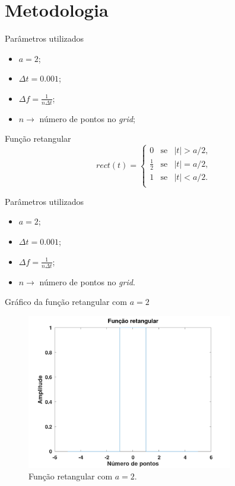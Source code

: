 \documentclass{beamer}
\begin{document}

\section{Metodologia}

\begin{frame}{Parâmetros utilizados}
\begin{itemize}
	\item $a=2$;
	\item $\Delta t=0.001$;
	\item $\Delta f = \frac{1}{n\Delta t}$;
	\item $n \rightarrow$ número de pontos no \textit{grid};
\end{itemize}		
\end{frame}

\begin{frame}{Função retangular}
	\begin{equation}
	rect(t)=\left\{\begin{matrix} 0 & \text{se} &  |t|> a/2,\\
	\frac{1}{2} & \text{se} & |t| = a/2,\\
	1 & \text{se} & |t| < a/2. \\
	\end{matrix}\right. \nonumber
	\end{equation}
\end{frame}

\begin{frame}{Parâmetros utilizados}
	\begin{itemize}
		\item $a=2$;
		\item $\Delta t=0.001$;
		\item $\Delta f = \frac{1}{n\Delta t}$;
		\item $n \rightarrow$ número de pontos no \textit{grid}.
	\end{itemize}		
\end{frame}

\begin{frame}{Gráfico da função retangular com $a=2$}
\begin{figure}[htb]
	\centering
	\includegraphics[width=9cm]{retangular}
	\caption{Função retangular com $a=2$.}
\end{figure}
\end{frame}
\end{document}
